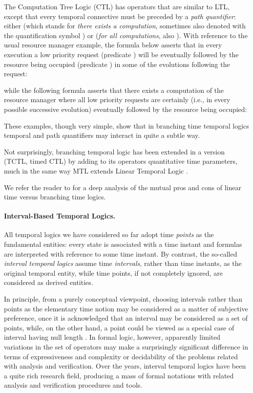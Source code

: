 The Computation Tree Logic (CTL) \cite{EH86} has operators that are 
similar to LTL, except that every temporal connective must be 
preceded by a \emph{path quantifier}: either  (which stands 
for \emph{there exists a computation}, sometimes also denoted with 
the quantification symbol ) or  (\emph{for all computations}, 
also ). With reference to the usual resource manager 
example, the formula below asserts that in every execution 
a low priority request (predicate ) will be eventually followed 
by the resource being occupied (predicate ) in some of 
the evolutions following the request:

while the following formula asserts that there exists a computation 
of the resource manager where all low priority requests are certainly 
(i.e., in every possible successive evolution) eventually followed by the 
resource being occupied: 


These examples, though very simple, show that in branching time
temporal logics temporal and path quantifiers may interact in quite a
subtle way.

Not surprisingly, branching temporal logic has been extended 
in a  version (TCTL, timed CTL) by adding to its operators 
quantitative time parameters, much in the same way MTL extends 
Linear Temporal Logic \cite{ACD93,HNSY94}. 

We refer the reader to \cite{Var01} for a deep analysis of the mutual 
pros and cons of linear time versus branching time logics.


\paragraph{Interval-Based Temporal Logics.}
All temporal logics we have considered so far adopt time \emph{points} 
as the fundamental entities: every state is associated with a 
time instant and formulas are interpreted with reference to some 
time instant. By contrast, the so-called \emph{interval temporal 
logics} assume time \emph{intervals}, rather than time instants, 
as the original temporal entity, while time points, if not completely 
ignored, are considered as derived entities. 

In principle, from a purely conceptual viewpoint, choosing intervals 
rather than points as the elementary time notion may be considered 
as a matter of subjective preference, once it is acknowledged 
that an interval may be considered as a set of points, while, 
on the other hand, a point could be viewed as a special case 
of interval having null length \cite{Koy92}. In formal logic, however, 
apparently limited variations in the set of operators may make 
a surprisingly significant difference in terms of expressiveness 
and complexity or decidability of the problems related with analysis 
and verification. Over the years, interval temporal logics have 
been a quite rich research field, producing a mass of formal 
notations with related analysis and verification procedures and 
tools.

